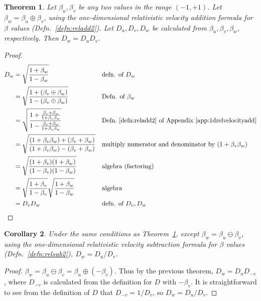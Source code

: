 \documentclass[a4paper]{article}
\theoremstyle{plain}
\newtheorem{theorem}{Theorem}
\newtheorem{corollary}[theorem]{Corollary}
\theoremstyle{definition}
\begin{document}
\begin{theorem}
\label{thm:velAddLeadsToDopplerFProduct}
Let $\beta_u, \beta_v$ be any two values in the range $(-1, +1)$.
Let $\beta_w = \beta_u \oplus \beta_v$, using the one-dimensional
relativistic velocity addition formula for $\beta$ values
(Defn.~\eqref{defn:reladd2}).
Let $D_u, D_v, D_w$ be calculated from $\beta_u, \beta_v, \beta_w$,
respectively.
Then $D_w = D_u D_v$.
\end{theorem}

\begin{proof}
\begin{align*}
D_w & = \sqrt{ \frac{1+\beta_w}{1-\beta_w} } & & \text{defn. of $D_w$} \\
    & = \sqrt{ \frac{1+(\beta_v \oplus \beta_w)}{1-(\beta_v \oplus \beta_w)} } & & \text{Defn. of $\beta_w$} \\
    & = \sqrt{ \frac{1+\frac{\beta_v + \beta_w}{1 + \beta_v \beta_w}}{1-\frac{\beta_v + \beta_w}{1 + \beta_v \beta_w}} } & & \text{Defn.~\eqref{defn:reladd2} of Appendix~\ref{app:1drelvelocityadd}} \\
    & = \sqrt{ \frac{(1+\beta_v \beta_w)+(\beta_v + \beta_w)}{(1+\beta_v \beta_w)-(\beta_v + \beta_w)} } & & \text{multiply numerator and denominator by $(1+\beta_v \beta_w)$} \\
    & = \sqrt{ \frac{(1+\beta_v)(1+\beta_w)}{(1-\beta_v)(1-\beta_w)} } & & \text{algebra (factoring)} \\
    & = \sqrt{\frac{1+\beta_v}{1-\beta_v}} \sqrt{\frac{1+\beta_w}{1-\beta_w}} & & \text{algebra} \\
    & = D_v D_w & & \text{defn. of $D_v, D_w$}
\end{align*}
\end{proof}

\begin{corollary}
\label{thm:velSubLeadsToDopplerFQuotient}
Under the same conditions as Theorem~\ref{thm:velAddLeadsToDopplerFProduct},
except $\beta_w = \beta_u \ominus \beta_v$, using the one-dimensional
relativistic velocity subtraction formula for $\beta$ values
(Defn.~\eqref{defn:relsub2}),
$D_w = D_u / D_v$.
\end{corollary}

\begin{proof}
$\beta_w = \beta_u \ominus \beta_v = \beta_u \oplus (-\beta_v)$.
Thus by the previous theorem, $D_w = D_u D_{-v}$,
where $D_{-v}$ is calculated from the definition for $D$ with $-\beta_v$.
It is straightforward to see from the definition of $D$ that
$D_{-v} = 1/D_v$, so $D_w = D_u / D_v$.
\end{proof}
\end{document}
